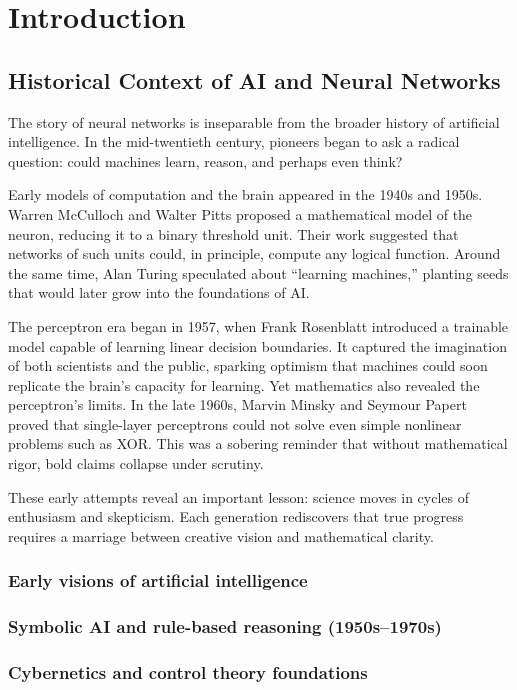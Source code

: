 ﻿\chapter{Introduction}

\section{Historical Context of AI and Neural Networks}

The story of neural networks is inseparable from the broader history of artificial intelligence. In the mid-twentieth century, pioneers began to ask a radical question: could machines learn, reason, and perhaps even think?

Early models of computation and the brain appeared in the 1940s and 1950s. Warren McCulloch and Walter Pitts proposed a mathematical model of the neuron, reducing it to a binary threshold unit. Their work suggested that networks of such units could, in principle, compute any logical function. Around the same time, Alan Turing speculated about ``learning machines,'' planting seeds that would later grow into the foundations of AI.

The perceptron era began in 1957, when Frank Rosenblatt introduced a trainable model capable of learning linear decision boundaries. It captured the imagination of both scientists and the public, sparking optimism that machines could soon replicate the brain’s capacity for learning. Yet mathematics also revealed the perceptron’s limits. In the late 1960s, Marvin Minsky and Seymour Papert proved that single-layer perceptrons could not solve even simple nonlinear problems such as XOR. This was a sobering reminder that without mathematical rigor, bold claims collapse under scrutiny.

These early attempts reveal an important lesson: science moves in cycles of enthusiasm and skepticism. Each generation rediscovers that true progress requires a marriage between creative vision and mathematical clarity.

\subsection{Early visions of artificial intelligence}
\subsection{Symbolic AI and rule-based reasoning (1950s--1970s)}
\subsection{Cybernetics and control theory foundations}
